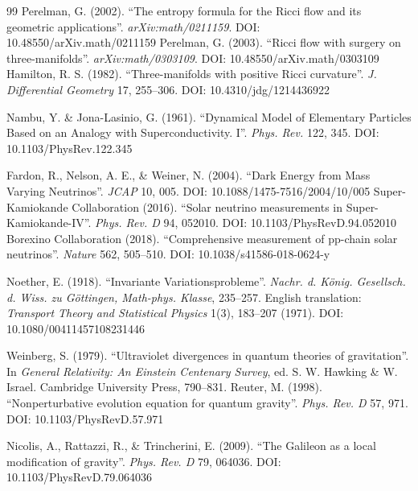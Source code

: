\documentclass[a4paper,12pt]{article}
\begin{document}
\begin{thebibliography}{99}
 Perelman, G. (2002). ``The entropy formula for the Ricci flow and its geometric applications''. \textit{arXiv:math/0211159}. DOI: 10.48550/arXiv.math/0211159
 Perelman, G. (2003). ``Ricci flow with surgery on three-manifolds''. \textit{arXiv:math/0303109}. DOI: 10.48550/arXiv.math/0303109
 Hamilton, R. S. (1982). ``Three-manifolds with positive Ricci curvature''. \textit{J. Differential Geometry} 17, 255--306. DOI: 10.4310/jdg/1214436922

 Nambu, Y. \& Jona-Lasinio, G. (1961). ``Dynamical Model of Elementary Particles Based on an Analogy with Superconductivity. I''. \textit{Phys. Rev.} 122, 345. DOI: 10.1103/PhysRev.122.345

 Fardon, R., Nelson, A. E., \& Weiner, N. (2004). ``Dark Energy from Mass Varying Neutrinos''. \textit{JCAP} 10, 005. DOI: 10.1088/1475-7516/2004/10/005
 Super-Kamiokande Collaboration (2016). ``Solar neutrino measurements in Super-Kamiokande-IV''. \textit{Phys. Rev. D} 94, 052010. DOI: 10.1103/PhysRevD.94.052010
 Borexino Collaboration (2018). ``Comprehensive measurement of pp-chain solar neutrinos''. \textit{Nature} 562, 505--510. DOI: 10.1038/s41586-018-0624-y

 Noether, E. (1918). ``Invariante Variationsprobleme''. \textit{Nachr. d. König. Gesellsch. d. Wiss. zu Göttingen, Math-phys. Klasse}, 235--257. English translation: \textit{Transport Theory and Statistical Physics} 1(3), 183--207 (1971). DOI: 10.1080/00411457108231446


 Weinberg, S. (1979). ``Ultraviolet divergences in quantum theories of gravitation''. In \textit{General Relativity: An Einstein Centenary Survey}, ed. S. W. Hawking \& W. Israel. Cambridge University Press, 790--831.
 Reuter, M. (1998). ``Nonperturbative evolution equation for quantum gravity''. \textit{Phys. Rev. D} 57, 971. DOI: 10.1103/PhysRevD.57.971

 Nicolis, A., Rattazzi, R., \& Trincherini, E. (2009). ``The Galileon as a local modification of gravity''. \textit{Phys. Rev. D} 79, 064036. DOI: 10.1103/PhysRevD.79.064036

\end{thebibliography}
\end{document}

